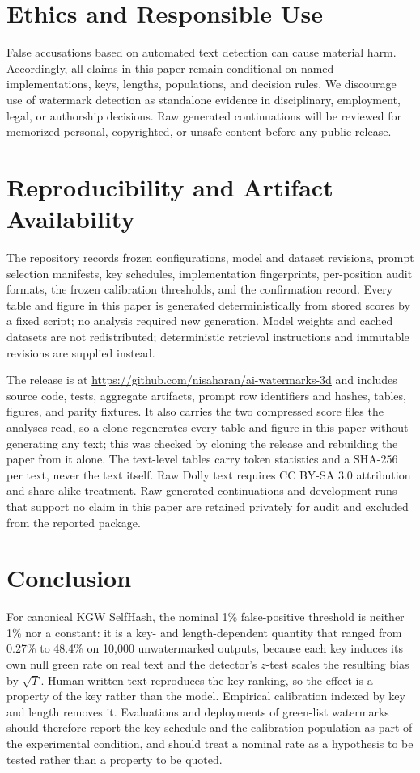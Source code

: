 \documentclass[conference]{IEEEtran}
\begin{document}
\section{Ethics and Responsible Use}

False accusations based on automated text detection can cause material harm.
Accordingly, all claims in this paper remain conditional on named implementations,
keys, lengths, populations, and decision rules. We discourage use of watermark
detection as standalone evidence in disciplinary, employment, legal, or authorship
decisions. Raw generated continuations will be reviewed for memorized personal,
copyrighted, or unsafe content before any public release.

\section{Reproducibility and Artifact Availability}

The repository records frozen configurations, model and dataset revisions, prompt
selection manifests, key schedules, implementation fingerprints, per-position
audit formats, the frozen calibration thresholds, and the confirmation record.
Every table and figure in this paper is generated deterministically from stored
scores by a fixed script; no analysis required new generation. Model weights and
cached datasets are not redistributed; deterministic retrieval instructions and
immutable revisions are supplied instead.

The release is at \url{https://github.com/nisaharan/ai-watermarks-3d} and
includes source code, tests, aggregate artifacts, prompt row identifiers and
hashes, tables, figures, and parity fixtures. It also carries the two compressed
score files the analyses read, so a clone regenerates every table and figure in
this paper without generating any text; this was checked by cloning the release
and rebuilding the paper from it alone. The text-level tables carry token
statistics and a SHA-256 per text, never the text itself. Raw Dolly text requires
CC BY-SA 3.0 attribution and share-alike treatment. Raw generated continuations
and development runs that support no claim in this paper are retained privately
for audit and excluded from the reported package.

\section{Conclusion}

For canonical KGW SelfHash, the nominal 1\% false-positive threshold is neither
1\% nor a constant: it is a key- and length-dependent quantity that ranged from
0.27\% to 48.4\% on 10,000 unwatermarked outputs, because each key induces its
own null green rate on real text and the detector's $z$-test scales the resulting
bias by $\sqrt{T}$. Human-written text reproduces the key ranking, so the effect is
a property of the key rather than the model. Empirical calibration indexed by key
and length removes it. Evaluations and deployments of green-list watermarks should
therefore report the key schedule and the calibration population as part of the
experimental condition, and should treat a nominal rate as a hypothesis to be
tested rather than a property to be quoted.
\end{document}
